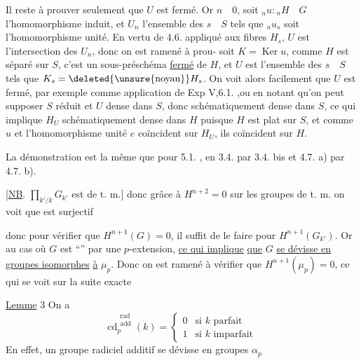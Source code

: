 Il reste à prouver seulement que $U$ est fermé. Or 
$n\quad0$, soit ${}_n u:{}_n H\quad G$ l'homomorphisme induit, et $U_n$ l'ensemble des
$s\quad S$ tels que ${}_n u_s$ soit l'homomorphisme unité. En vertu de 4.6. appliqué
aux fibres $H_s$, $U$ est l'intersection des $U_n$, donc on est ramené à prou-
soit $K=\operatorname{Ker}u$, comme $H$ est séparé sur $S$, c'est un sous-préschéma
\uline{fermé} de $H$, et $U$ est l'ensemble des $s\quad S$ tels que $K_s=\deleted{\text{\unsure{noyau}}}H_s$. On
voit alors  facilement que $U$ est fermé, par exemple comme
application de Exp V,6.1. ,ou en  notant qu'on peut
supposer $S$ réduit et $U$ dense dans $S$, donc schématiquement dense dans $S$,
ce qui implique $H_U$ schématiquement dense dans $H$ puisque $H$ est plat sur
$S$, et comme $u$ et l'homomorphisme unité $e$ coïncident sur $H_U$, ils
coïncident sur $H$.

La démonstration est la même que pour 5.1. , en 
3.4. par 3.4. bis et 4.7. a) par 4.7. b).


[\uline{NB}. $\prod_{k'/k}G_{k'}$ est de t. m.] donc grâce à
$H^{n+2}=0$ sur les groupes de t. m. on voit que
est surjectif

donc pour vérifier que $H^{n+1}(G)=0$, il suffit
de le faire pour $H^{n+1}(G_{k'})$. Or
  au cas où $G$ est ``''
par une $p$-extension, \uline{ce qui implique}
\uline{que} $G$ \uline{se dévisse en groupes isomorphes}
\uline{à} $\mu_p$. Donc on est ramené à vérifier
que $H^{n+1}(\mu_p)=0$, ce qui se voit sur
la suite exacte

\uline{Lemme} 3  On a
\[
\mathrm{cd}^{\substack{\text{rad}\\\text{add}}}_p(k)=
\begin{cases}0&\text{si }k\text{ parfait}\\1&\text{si }k\text{ imparfait}\end{cases}
\]
En effet, un groupe radiciel additif se dévisse en
groupes $\alpha_p$ \unsure{\ldots}

